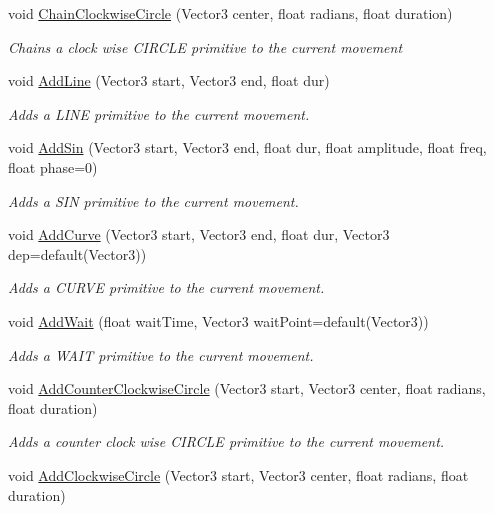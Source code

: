 \begin{DoxyCompactItemize}
void \hyperlink{class_movement_aa0bd052048b2ccce6325c8343959eed2}{Chain\+Clockwise\+Circle} (Vector3 center, float radians, float duration)
\begin{DoxyCompactList}\small\item\em Chains a clock wise C\+I\+R\+C\+L\+E primitive to the current movement \end{DoxyCompactList}\item 
void \hyperlink{class_movement_aacae27072494a3b8d46363a5e401da14}{Add\+Line} (Vector3 start, Vector3 end, float dur)
\begin{DoxyCompactList}\small\item\em Adds a L\+I\+N\+E primitive to the current movement. \end{DoxyCompactList}\item 
void \hyperlink{class_movement_a3861de93b2d224b15a97bb7f4ae9febe}{Add\+Sin} (Vector3 start, Vector3 end, float dur, float amplitude, float freq, float phase=0)
\begin{DoxyCompactList}\small\item\em Adds a S\+I\+N primitive to the current movement. \end{DoxyCompactList}\item 
void \hyperlink{class_movement_ad4a5d254790bead60517728d2dd421ce}{Add\+Curve} (Vector3 start, Vector3 end, float dur, Vector3 dep=default(Vector3))
\begin{DoxyCompactList}\small\item\em Adds a C\+U\+R\+V\+E primitive to the current movement. \end{DoxyCompactList}\item 
void \hyperlink{class_movement_a9da7f6f6db80332026d60c2e0f00365a}{Add\+Wait} (float wait\+Time, Vector3 wait\+Point=default(Vector3))
\begin{DoxyCompactList}\small\item\em Adds a W\+A\+I\+T primitive to the current movement. \end{DoxyCompactList}\item 
void \hyperlink{class_movement_a360254a00c14db9b7b3392ceb88992ad}{Add\+Counter\+Clockwise\+Circle} (Vector3 start, Vector3 center, float radians, float duration)
\begin{DoxyCompactList}\small\item\em Adds a counter clock wise C\+I\+R\+C\+L\+E primitive to the current movement. \end{DoxyCompactList}\item 
void \hyperlink{class_movement_a625ade844cb487d4af4cd132b9adb542}{Add\+Clockwise\+Circle} (Vector3 start, Vector3 center, float radians, float duration)

\end{DoxyCompactItemize}
